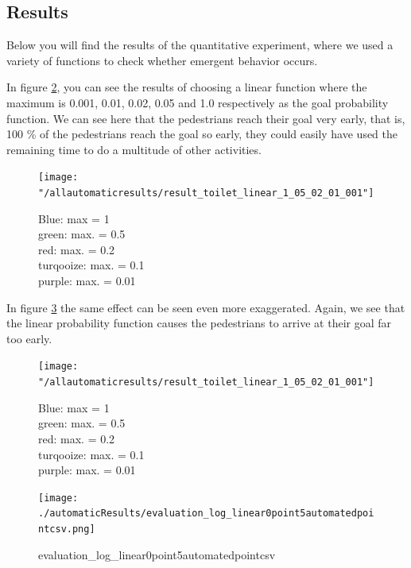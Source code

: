 \documentclass[11pt]{book}
\begin{document}
\subsection{Results}
Below you will find the results of the quantitative experiment, where we used a variety of functions to check whether emergent behavior occurs.

In figure \ref{result_toilet_linear_1_05_02_01_001}, you can see the results of choosing a linear function where the maximum is 0.001, 0.01, 0.02, 0.05 and 1.0 respectively as the goal probability function. We can see here that the pedestrians reach their goal very early, that is, 100 \% of the pedestrians reach the goal so early, they could easily have used the remaining time to do a multitude of other activities.

\begin{figure}
\centering
\texttt{[image: "/allautomaticresults/result\_toilet\_linear\_1\_05\_02\_01\_001"]}
\caption{Blue: max = 1\\ green: max. = 0.5\\ red: max. = 0.2\\ turqooize: max. = 0.1\\ purple: max. = 0.01}
\label{result_toilet_linear_1_05_02_01_001}
\end{figure}

In figure \ref{evaluation_log_linear0point5automatedpointcsv} the same effect can be seen even more exaggerated. Again, we see that the linear probability function causes the pedestrians to arrive at their goal far too early.

\begin{figure}
\centering
\texttt{[image: "/allautomaticresults/result\_toilet\_linear\_1\_05\_02\_01\_001"]}
\caption{Blue: max = 1\\ green: max. = 0.5\\ red: max. = 0.2\\ turqooize: max. = 0.1\\ purple: max. = 0.01}
\label{result_toilet_linear_1_05_02_01_001}
\end{figure}


\begin{figure}
\centering
\texttt{[image: ./automaticResults/evaluation\_log\_linear0point5automatedpointcsv.png]}
\caption{evaluation\_log\_linear0point5automatedpointcsv}
\label{evaluation_log_linear0point5automatedpointcsv}
\end{figure}
\end{document}
